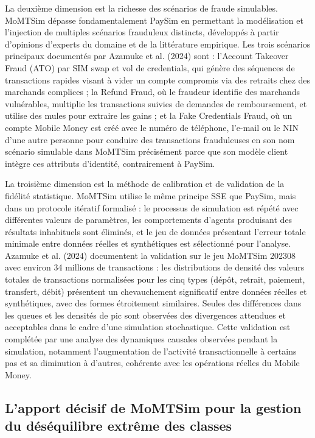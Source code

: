 \documentclass[11pt,a4paper,oneside]{report}
\theoremstyle{definition}
\theoremstyle{remark}
\begin{document}
La deuxième dimension est la richesse des scénarios de fraude simulables. MoMTSim dépasse fondamentalement PaySim en permettant la modélisation et l'injection de multiples scénarios frauduleux distincts, développés à partir d'opinions d'experts du domaine et de la littérature empirique. Les trois scénarios principaux documentés par Azamuke et al. (2024) sont : l'Account Takeover Fraud (ATO) par SIM swap et vol de credentials, qui génère des séquences de transactions rapides visant à vider un compte compromis via des retraits chez des marchands complices ; la Refund Fraud, où le fraudeur identifie des marchands vulnérables, multiplie les transactions suivies de demandes de remboursement, et utilise des mules pour extraire les gains ; et la Fake Credentials Fraud, où un compte Mobile Money est créé avec le numéro de téléphone, l'e-mail ou le NIN d'une autre personne pour conduire des transactions frauduleuses en son nom  scénario simulable dans MoMTSim précisément parce que son modèle client intègre ces attributs d'identité, contrairement à PaySim.

La troisième dimension est la méthode de calibration et de validation de la fidélité statistique. MoMTSim utilise le même principe SSE que PaySim, mais dans un protocole itératif formalisé : le processus de simulation est répété avec différentes valeurs de paramètres, les comportements d'agents produisant des résultats inhabituels sont éliminés, et le jeu de données présentant l'erreur totale minimale entre données réelles et synthétiques est sélectionné pour l'analyse. Azamuke et al. (2024) documentent la validation sur le jeu MoMTSim 202308 avec environ 34 millions de transactions : les distributions de densité des valeurs totales de transactions normalisées pour les cinq types (dépôt, retrait, paiement, transfert, débit) présentent un chevauchement significatif entre données réelles et synthétiques, avec des formes étroitement similaires. Seules des différences dans les queues et les densités de pic sont observées  des divergences attendues et acceptables dans le cadre d'une simulation stochastique. Cette validation est complétée par une analyse des dynamiques causales observées pendant la simulation, notamment l'augmentation de l'activité transactionnelle à certains pas et sa diminution à d'autres, cohérente avec les opérations réelles du Mobile Money.

\subsection{L'apport décisif de MoMTSim pour la gestion du déséquilibre extrême des classes}
\end{document}
